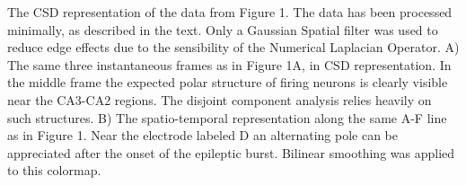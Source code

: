  The CSD representation of the data from Figure 1. The data has been processed minimally, as described in the text. Only a Gaussian Spatial filter was used to reduce edge effects due to the sensibility of the Numerical Laplacian Operator.
A) The same three instantaneous frames as in Figure 1A, in CSD representation. In the middle frame the expected polar structure of firing neurons is clearly visible near the CA3-CA2 regions. The disjoint component analysis relies heavily on such structures.
B) The spatio-temporal representation along the same A-F line as in Figure 1. Near the electrode labeled D an alternating pole can be appreciated after the onset of the epileptic burst. Bilinear smoothing was applied to this colormap.


